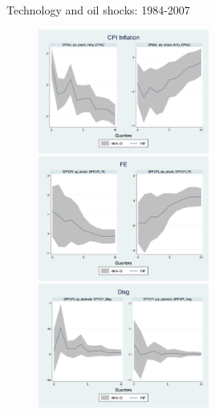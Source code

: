 \documentclass{beamer}
\begin{document}
\begin{frame}{Technology and oil shocks: 1984-2007}

\begin{figure}
	\includegraphics[width=0.5\textwidth,totalheight=0.28\textheight]{figuresDraft/CPIAU_ashocks_nmp_before2007.png}  \\ 
\smallskip
\includegraphics[width=0.5\textwidth,totalheight=0.28\textheight]{figuresDraft/SPFFE_ashocks_nmp_before2007.png} \\
\smallskip
\includegraphics[width=0.5\textwidth,totalheight=0.28\textheight]{figuresDraft/SPFDisg_ab_ashocks_nmp_before2007.png} 
\end{figure}

\end{frame}
\end{document}
